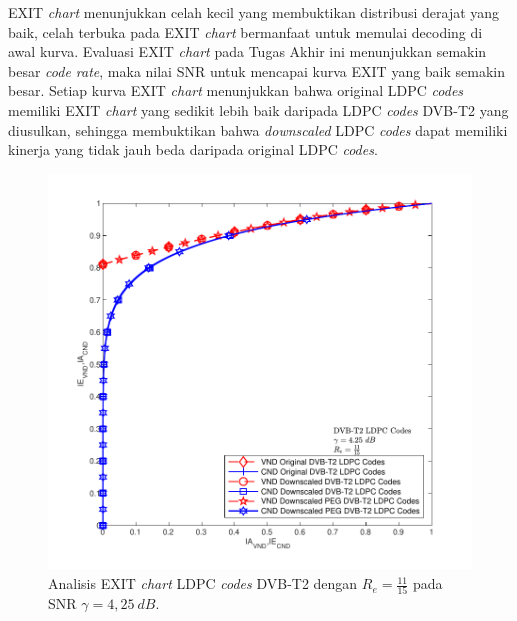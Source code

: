 EXIT \textit{chart} menunjukkan celah kecil yang membuktikan distribusi derajat yang baik, celah terbuka pada EXIT \textit{chart} bermanfaat untuk memulai decoding di awal kurva. Evaluasi EXIT \textit{chart} pada Tugas Akhir ini menunjukkan semakin besar \textit{code rate}, maka nilai SNR untuk mencapai kurva EXIT yang baik semakin besar. Setiap kurva EXIT \textit{chart} menunjukkan bahwa original LDPC \textit{codes} memiliki EXIT \textit{chart} yang sedikit lebih baik daripada LDPC \textit{codes} DVB-T2 yang diusulkan, sehingga membuktikan bahwa \textit{downscaled} LDPC \textit{codes} dapat memiliki kinerja yang tidak jauh beda daripada original LDPC \textit{codes}.
\begin{figure}[b!]
	\centering
	\includegraphics[width=1\textwidth]
	{pics/exit/34/34semua=snr4,25Ich=0,8113.pdf}
	\caption{Analisis EXIT \textit{chart} LDPC \textit{codes} DVB-T2 dengan $R_e=\frac{11}{15}$ pada SNR $\gamma=4,25~dB$.}
	\label{fig:exit3}
\end{figure}

